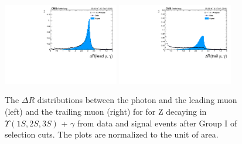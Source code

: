 \begin{figure}[!htbp]
\begin{center}
\includegraphics[width=0.45\textwidth]{figures/outputPlots/ZtoUpsilon_Cat0_ZZZZZ/au/data_x_mc/noKinCuts/h_noKin_deltaR_Leading_Photon}\hspace*{1.cm}
\includegraphics[width=0.45\textwidth]{figures/outputPlots/ZtoUpsilon_Cat0_ZZZZZ/au/data_x_mc/noKinCuts/h_noKin_deltaR_Trailing_Photon}\end{center}\vspace*{-.5cm}
\caption{The $\Delta R$ distributions between the photon and the leading muon (left) and the trailing muon (right) for for Z decaying in $\Upsilon(1S,2S,3S)$ + $\gamma$ from data and signal events after Group I of selection cuts. The plots are normalized to the unit of area.}
\label{fig:deltaR_ZtoUpsilon_Cat0}
\end{figure}

